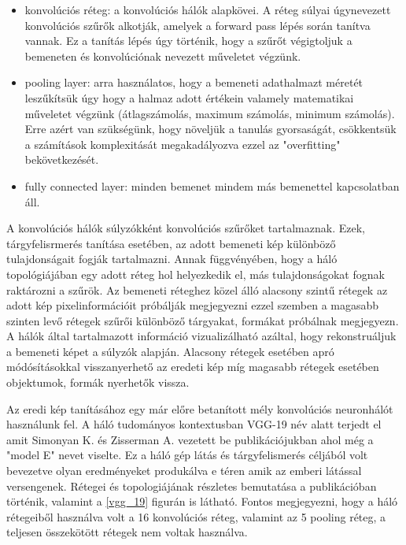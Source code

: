\documentclass[12pt, a4paper, oneside]{book}
\theoremstyle{tetel}
\begin{document}
\begin{itemize}
	\item konvolúciós réteg: a konvolúciós hálók alapkövei. A réteg súlyai úgynevezett konvolúciós szűrők alkotják, amelyek a forward pass lépés során tanítva vannak. Ez a tanítás lépés úgy történik, hogy a szűrőt végigtoljuk a bemeneten és konvolúciónak nevezett műveletet végzünk. 
	\item pooling layer: arra használatos, hogy a bemeneti adathalmazt méretét leszűkítsük úgy hogy a halmaz adott értékein valamely matematikai műveletet végzünk (átlagszámolás, maximum számolás, minimum számolás). Erre azért van szükségünk, hogy növeljük a tanulás gyorsaságát, csökkentsük a számítások komplexitását megakadályozva ezzel az "overfitting" bekövetkezését.
	\item fully connected layer: minden bemenet mindem más bemenettel kapcsolatban áll.
\end{itemize}

A konvolúciós hálók súlyzókként konvolúciós szűrőket tartalmaznak. Ezek, tárgyfelisrmerés tanítása esetében, az adott bemeneti kép különböző tulajdonságait fogják tartalmazni. Annak függvényében, hogy a háló topológiájában egy adott réteg hol helyezkedik el, más tulajdonságokat fognak raktározni a szűrök. Az bemeneti réteghez közel álló alacsony szintű rétegek az adott kép pixelinformációit próbálják megjegyezni ezzel szemben a magasabb szinten levő rétegek szűrői különböző tárgyakat, formákat próbálnak megjegyezn\cite{27}\cite{28}. A hálók által tartalmazott információ vizualizálható azáltal, hogy rekonstruáljuk a bemeneti képet a súlyzók alapján. Alacsony rétegek esetében apró módósításokkal visszanyerhető az eredeti kép míg magasabb rétegek esetében objektumok, formák nyerhetők vissza.

Az eredi kép tanításához egy már előre betanított mély konvolúciós neuronhálót használunk fel. A háló tudományos kontextusban VGG-19 név alatt terjedt el amit Simonyan K. és  Zisserman A. vezetett be publikációjukban\cite{29} ahol még a "model E" nevet viselte. Ez a háló gép látás és tárgyfelismerés céljából volt bevezetve olyan eredményeket produkálva e téren amik az emberi látással versengenek. Rétegei és topologiájának részletes bemutatása a \cite{29} publikációban történik, valamint a \ref{vgg_19} figurán is látható. Fontos megjegyezni, hogy a háló rétegeiből használva volt a 16 konvolúciós réteg, valamint az 5 pooling réteg, a teljesen összekötött rétegek nem voltak használva.
\end{document}
